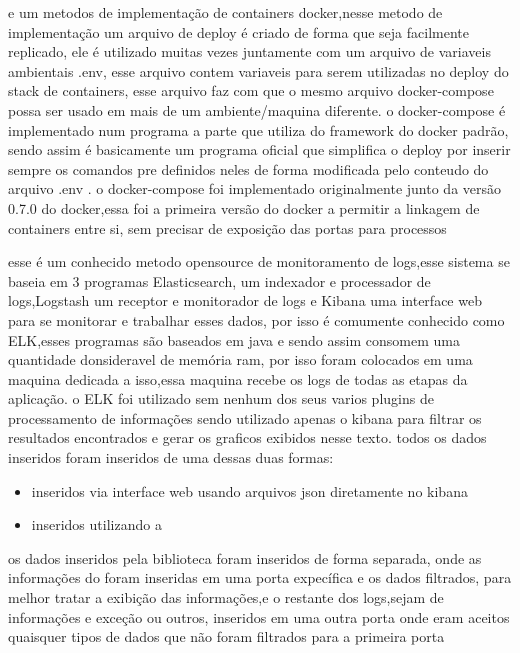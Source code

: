 \documentclass[
	12pt,				%
	openright,			%
	oneside,			%
	a4paper,			%
	english,			%
	french,				%
	spanish,			%
	brazil,				%
	]{abntex2}
\begin{document}
\cite{dockercomposedoc}
e um metodos de implementação de containers docker,nesse metodo de implementação um arquivo de deploy é criado de forma que seja facilmente replicado,
ele é utilizado muitas vezes juntamente com um arquivo de variaveis ambientais .env,
esse arquivo contem variaveis para serem utilizadas no deploy do stack de containers,
esse arquivo faz com que o mesmo arquivo docker-compose possa ser usado em mais de um ambiente/maquina diferente.
o docker-compose é implementado num programa a parte que utiliza do framework do docker padrão,
sendo assim é basicamente um programa oficial que simplifica o deploy por inserir sempre os comandos pre definidos neles de forma modificada pelo conteudo do arquivo .env .
o docker-compose foi implementado originalmente junto da versão 0.7.0 do docker,essa foi a primeira versão do docker a permitir a linkagem de containers entre si,
sem precisar de exposição das portas para processos 


esse é um conhecido metodo opensource de monitoramento de logs,esse sistema se baseia em 3 programas Elasticsearch,
um indexador e processador de logs,Logstash um receptor e monitorador de logs e Kibana uma interface web para se monitorar e trabalhar esses dados,
por isso é comumente conhecido como ELK,esses programas são baseados em java e sendo assim consomem uma quantidade donsideravel de memória ram,
por isso foram colocados em uma maquina dedicada a isso,essa maquina recebe os logs de todas as etapas da aplicação.
o ELK foi utilizado sem nenhum dos seus varios plugins de processamento de informações sendo utilizado apenas o kibana para filtrar os resultados encontrados e gerar os graficos exibidos nesse texto.
todos os dados inseridos foram inseridos de uma dessas duas formas:
\cite{elk}
\begin{itemize}
 \item inseridos via interface web usando arquivos json diretamente no kibana
 \item inseridos utilizando a 
\end{itemize}
os dados inseridos pela biblioteca  foram inseridos de forma separada,
onde as informações do  foram inseridas em uma porta expecífica e os dados filtrados,
para melhor tratar a exibição das informações,e o restante dos logs,sejam de informações e exceção ou outros,
inseridos em uma outra porta onde eram aceitos quaisquer tipos de dados que não foram filtrados para a primeira porta
\end{document}
